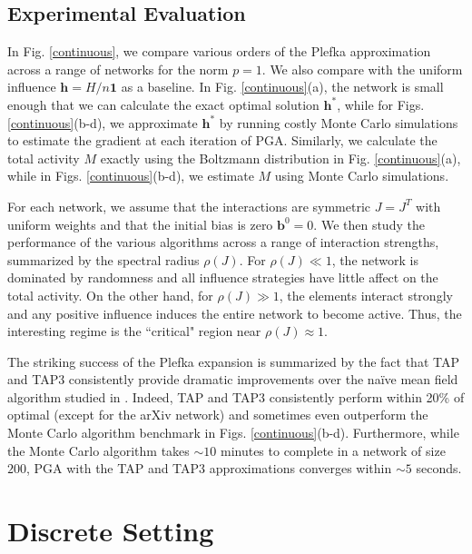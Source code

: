 \documentclass[letterpaper]{article} %
\begin{document}
\subsection{Experimental Evaluation}

In Fig. \ref{continuous}, we compare various orders of the Plefka approximation across a range of networks for the norm $p=1$. We also compare with the uniform influence $\bm{h}=H/n\bm{1}$ as a baseline. In Fig. \ref{continuous}(a), the network is small enough that we can calculate the exact optimal solution $\bm{h}^*$, while for Figs. \ref{continuous}(b-d), we approximate $\bm{h}^*$ by running costly Monte Carlo simulations to estimate the gradient at each iteration of PGA. Similarly, we calculate the total activity $M$ exactly using the Boltzmann distribution in Fig. \ref{continuous}(a), while in Figs. \ref{continuous}(b-d), we estimate $M$ using Monte Carlo simulations.

For each network, we assume that the interactions are symmetric $J=J^T$ with uniform weights and that the initial bias is zero $\bm{b}^0=0$. We then study the performance of the various algorithms across a range of interaction strengths, summarized by the spectral radius $\rho(J)$. For $\rho(J)\ll 1$, the network is dominated by randomness and all influence strategies have little affect on the total activity. On the other hand, for $\rho(J) \gg 1$, the elements interact strongly and any positive influence induces the entire network to become active. Thus, the interesting regime is the ``critical" region near $\rho(J)\approx 1$.

The striking success of the Plefka expansion is summarized by the fact that TAP and TAP3 consistently provide dramatic improvements over the na\"{i}ve mean field algorithm studied in \cite{Lynn-01}. Indeed, TAP and TAP3 consistently perform within 20\% of optimal (except for the arXiv network) and sometimes even outperform the Monte Carlo algorithm benchmark in Figs. \ref{continuous}(b-d). Furthermore, while the Monte Carlo algorithm takes $\sim10$ minutes to complete in a network of size $200$, PGA with the TAP and TAP3 approximations converges within $\sim 5$ seconds.

\section{Discrete Setting}
\end{document}
